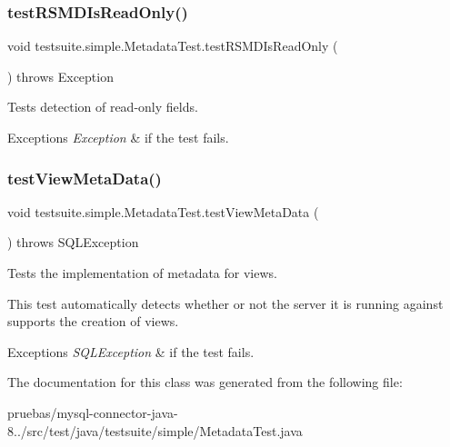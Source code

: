 \subsubsection{\texorpdfstring{test\+R\+S\+M\+D\+Is\+Read\+Only()}{testRSMDIsReadOnly()}}
{\footnotesize\ttfamily void testsuite.\+simple.\+Metadata\+Test.\+test\+R\+S\+M\+D\+Is\+Read\+Only (\begin{DoxyParamCaption}{ }\end{DoxyParamCaption}) throws Exception}

Tests detection of read-\/only fields.


\begin{DoxyExceptions}{Exceptions}
{\em Exception} & if the test fails. \\
\hline
\end{DoxyExceptions}
\mbox{\label{classtestsuite_1_1simple_1_1_metadata_test_a57723e10153ca42cc7eac867f896d662}} 
\subsubsection{\texorpdfstring{test\+View\+Meta\+Data()}{testViewMetaData()}}
{\footnotesize\ttfamily void testsuite.\+simple.\+Metadata\+Test.\+test\+View\+Meta\+Data (\begin{DoxyParamCaption}{ }\end{DoxyParamCaption}) throws S\+Q\+L\+Exception}

Tests the implementation of metadata for views.

This test automatically detects whether or not the server it is running against supports the creation of views.


\begin{DoxyExceptions}{Exceptions}
{\em S\+Q\+L\+Exception} & if the test fails. \\
\hline
\end{DoxyExceptions}


The documentation for this class was generated from the following file\+:\begin{DoxyCompactItemize}
\item 
pruebas/mysql-\/connector-\/java-\/8../src/test/java/testsuite/simple/Metadata\+Test.\+java\end{DoxyCompactItemize}
